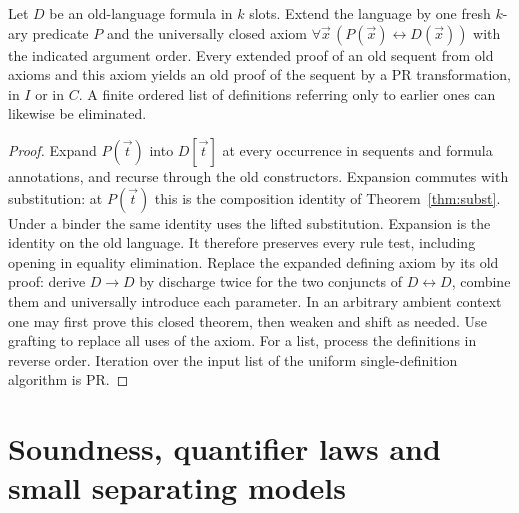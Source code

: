 \begin{theorem}\label{thm:def-abbrev}
Let $D$ be an old-language formula in $k$ slots. Extend the language
by one fresh $k$-ary predicate $P$ and the universally closed axiom
$\forall\vec x\,(P(\vec x)\leftrightarrow D(\vec x))$ with the indicated
argument order. Every extended proof of an old sequent from old axioms
and this axiom yields an old proof of the sequent by a PR transformation,
in $I$ or in $C$. A finite ordered list of definitions referring only to
earlier ones can likewise be eliminated.
\end{theorem}
\begin{proof}
Expand $P(\vec t)$ into $D[\vec t]$ at every occurrence in sequents
and formula annotations, and recurse through the old constructors.
Expansion commutes with substitution: at $P(\vec t)$ this is the
composition identity of Theorem~\ref{thm:subst}. Under a binder
the same identity uses the lifted substitution. Expansion is the
identity on the old language. It therefore preserves every rule
test, including opening in equality elimination. Replace the expanded
defining axiom by its old proof: derive $D\to D$ by discharge twice
for the two conjuncts of $D\leftrightarrow D$, combine them and
universally introduce each parameter. In an arbitrary ambient context
one may first prove this closed theorem, then weaken and shift as needed.
Use grafting to replace all uses of the axiom. For a list, process the
definitions in reverse order. Iteration over the input list of the
uniform single-definition algorithm is PR.
\end{proof}

\section{Soundness, quantifier laws and small separating models}
\label{sec:deduction-soundness}

